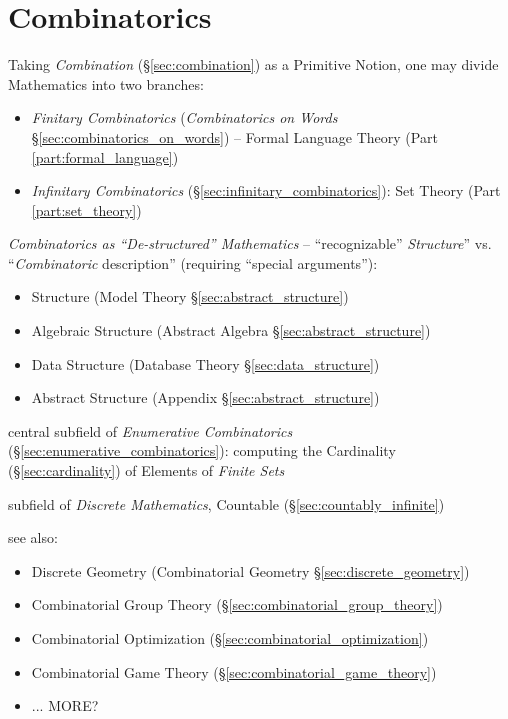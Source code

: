 \part{Combinatorics}\label{part:combinatorics}

Taking \emph{Combination} (\S\ref{sec:combination}) as a Primitive Notion,
one may divide Mathematics into two branches:
\begin{itemize}
  \item \emph{Finitary Combinatorics} (\emph{Combinatorics on Words}
    \S\ref{sec:combinatorics_on_words}) -- Formal Language Theory (Part
    \ref{part:formal_language})
  \item \emph{Infinitary Combinatorics} (\S\ref{sec:infinitary_combinatorics}):
    Set Theory (Part \ref{part:set_theory})
\end{itemize}

\emph{Combinatorics as ``De-structured'' Mathematics} -- ``recognizable''
\emph{Structure}'' vs. ``\emph{Combinatoric} description'' (requiring ``special
arguments''):
\begin{itemize}
  \item Structure (Model Theory \S\ref{sec:abstract_structure})
  \item Algebraic Structure (Abstract Algebra \S\ref{sec:abstract_structure})
  \item Data Structure (Database Theory \S\ref{sec:data_structure})
  \item Abstract Structure (Appendix \S\ref{sec:abstract_structure})
\end{itemize}

central subfield of \emph{Enumerative Combinatorics}
(\S\ref{sec:enumerative_combinatorics}): computing the Cardinality
(\S\ref{sec:cardinality}) of Elements of \emph{Finite Sets}

subfield of \emph{Discrete Mathematics}, Countable
(\S\ref{sec:countably_infinite})

see also:
\begin{itemize}
  \item Discrete Geometry (Combinatorial Geometry \S\ref{sec:discrete_geometry})
  \item Combinatorial Group Theory (\S\ref{sec:combinatorial_group_theory})
  \item Combinatorial Optimization (\S\ref{sec:combinatorial_optimization})
  \item Combinatorial Game Theory (\S\ref{sec:combinatorial_game_theory})
  \item ... MORE?
\end{itemize}

